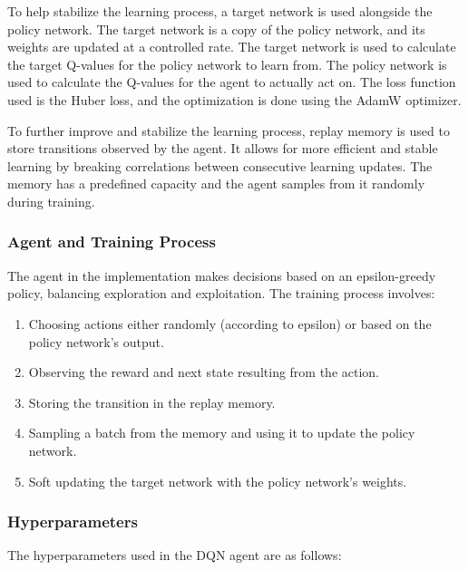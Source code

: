 \documentclass[12pt]{article}
\begin{document}
\noindent
To help stabilize the learning process, a target network is used alongside the policy network. The target network is a copy of the policy network, and its weights are updated at a controlled rate. The target network is used to calculate the target Q-values for the policy network to learn from. The policy network is used to calculate the Q-values for the agent to actually act on. The loss function used is the Huber loss, and the optimization is done using the AdamW optimizer.

To further improve and stabilize the learning process, replay memory is used to store transitions observed by the agent. It allows for more efficient and stable learning by breaking correlations between consecutive learning updates. The memory has a predefined capacity and the agent samples from it randomly during training.

\subsubsection{Agent and Training Process}
The agent in the implementation makes decisions based on an epsilon-greedy policy, balancing exploration and exploitation. The training process involves:
\begin{enumerate}
    \item Choosing actions either randomly (according to epsilon) or based on the policy network's output.
    \item Observing the reward and next state resulting from the action.
    \item Storing the transition in the replay memory.
    \item Sampling a batch from the memory and using it to update the policy network.
    \item Soft updating the target network with the policy network's weights.
\end{enumerate}

\noindent

\subsubsection{Hyperparameters}
The hyperparameters used in the DQN agent are as follows:
\end{document}
